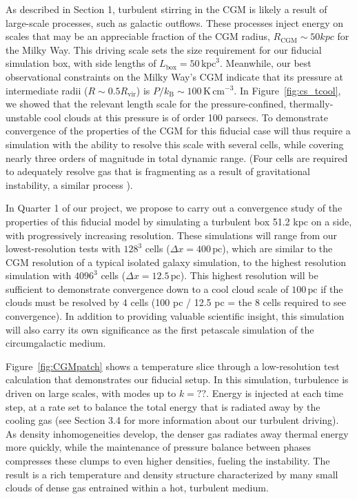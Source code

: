 \documentclass[11pt,letterpaper,english]{article}
\begin{document}
As described in Section 1, turbulent stirring in the CGM is likely a result of large-scale processes, such as galactic outflows. These processes inject energy on scales that may be an appreciable fraction of the CGM radius, $R_\mathrm{CGM} \sim 50 kpc$ for the Milky Way. This driving scale sets the size requirement for our fiducial simulation box, with side lengths of $L_\mathrm{box} = 50\,\mathrm{kpc}^{3}$. Meanwhile, our best observational constraints on the Milky Way's CGM indicate that its pressure at intermediate radii ($R \sim 0.5 R_\mathrm{vir}$) is $P/k_\mathrm{B} \sim 100\,\mathrm{K}\,\mathrm{cm}^{-3}$. In Figure~\ref{fig:cs_tcool}, we showed that the relevant length scale for the pressure-confined, thermally-unstable cool clouds at this pressure is of order 100 parsecs. To demonstrate convergence of the properties of the CGM for this fiducial case will thus require a simulation with the ability to resolve this scale with several cells, while covering nearly three orders of magnitude in total dynamic range. (Four cells are required to adequately resolve gas that is fragmenting as a result of gravitational instability, a similar process \cite{Truelove}).

In Quarter 1 of our project, we propose to carry out a convergence study of the properties of this fiducial model by simulating a turbulent box 51.2 kpc on a side, with progressively increasing resolution. These simulations will range from our lowest-resolution tests with $128^3$ cells ($\Delta x = 400\,\mathrm{pc}$), which are similar to the CGM resolution of a typical isolated galaxy simulation, to the highest resolution simulation with $4096^3$ cells ($\Delta x = 12.5\,\mathrm{pc}$). This highest resolution will be sufficient to demonstrate convergence down to a cool cloud scale of $100\,\mathrm{pc}$ if the clouds must be resolved by 4 cells (100 pc / 12.5 pc = the 8 cells required to see convergence). In addition to providing valuable scientific insight, this simulation will also carry its own significance as the first petascale simulation of the circumgalactic medium.

Figure~\ref{fig:CGMpatch} shows a temperature slice through a low-resolution test calculation that demonstrates our fiducial setup. In this simulation, turbulence is driven on large scales, with modes up to $k = ??$. Energy is injected at each time step, at a rate set to balance the total energy that is radiated away by the cooling gas (see Section 3.4 for more information about our turbulent driving). As density inhomogeneities develop, the denser gas radiates away thermal energy more quickly, while the maintenance of pressure balance between phases compresses these clumps to even higher densities, fueling the instability. The result is a rich temperature and density structure characterized by many small clouds of dense gas entrained within a hot, turbulent medium.
\end{document}
